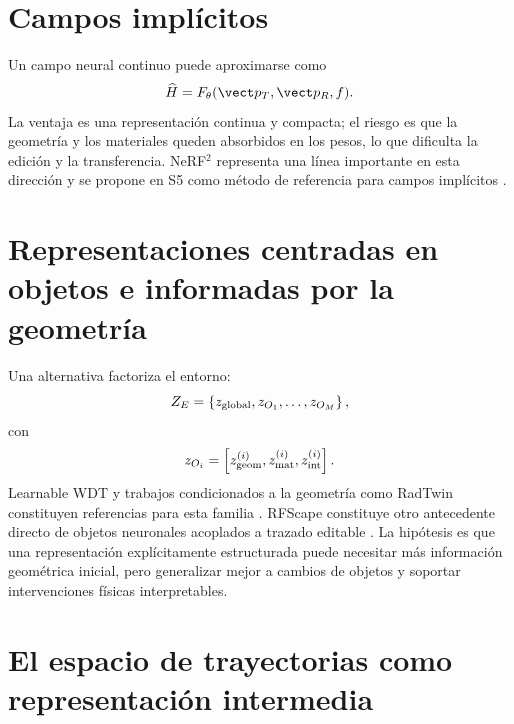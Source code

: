 \section{Campos implícitos}

Un campo neural continuo puede aproximarse como
\begin{equation}
\widehat H=F_\theta(\vect p_T,\vect p_R,f).
\end{equation}
La ventaja es una representación continua y compacta; el riesgo es que la geometría y los materiales queden absorbidos en los pesos, lo que dificulta la edición y la transferencia. NeRF$^2$ representa una línea importante en esta dirección y se propone en S5 como método de referencia para campos implícitos \citep{Zhao2023NeRF2}.

\section{Representaciones centradas en objetos e informadas por la geometría}

Una alternativa factoriza el entorno:
\begin{equation}
Z_E=\left\{z_{\rm global},z_{O_1},\ldots,z_{O_M}\right\},
\end{equation}
con
\begin{equation}
z_{O_i}=\left[z_{\rm geom}^{(i)},z_{\rm mat}^{(i)},z_{\rm int}^{(i)}\right].
\end{equation}
Learnable WDT y trabajos condicionados a la geometría como RadTwin constituyen referencias para esta familia \citep{Jiang2025LearnableWDT,Zhang2026RadTwin}. RFScape constituye otro antecedente directo de objetos neuronales acoplados
a trazado editable \citep{Chen2025RFScape}. La hipótesis es que una representación explícitamente estructurada puede necesitar más información geométrica inicial, pero generalizar mejor a cambios de objetos y soportar intervenciones físicas interpretables.

\section{El espacio de trayectorias como representación intermedia}

